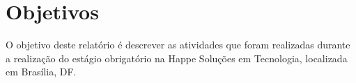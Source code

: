\section{Objetivos}

O objetivo deste relatório é descrever as atividades que foram realizadas
durante a realização do estágio obrigatório na Happe Soluções em Tecnologia,
localizada em Brasília, DF.



